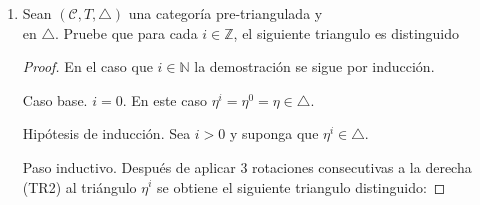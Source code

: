 \documentclass{article}
\begin{document}
\begin{enumerate}[label=\textbf{Ej \arabic*.}]
\begin{proof}
			Como $(\mathscr{C},T,\triangle)$ es categoría triangulada, por el axioma del octaedro existen $g:X'\to Y'$ y $f:Y'\to Z'$ tales que hacen conmutar
			el diagrama (2) y . Así\\
			, 
			y $f^{op},g^{op}$ hacen conmutar el diagrama (1), pues:
			\begin{itemize}
				\item[$\bullet$] $f^{op}i^{op}=(if)^{op}=(vk)^{op}=k^{op}v^{op}$\,.
				\item[$\bullet$] $-i'=f\circ (-k')$ entonces $(-i')^{op}=(f\circ (-k'))^{op}=-(k')^{op}f^{op}$\\ así $i^{op}=k'^{op}f^{op}$.
				\item[$\bullet$] $g^{op}k^{op}=(kg)^{op}=(r)^{op}$.
				\item[$\bullet$] $j^{op}g^{op}=(gj)^{op}=(kT^{-1}(u))^{op}=(T^{-1}(u))^{op}k^{op}=\tilde{T}(u^{op})k^{op}$.
			\end{itemize}
			
		\end{proof}
		\item Sean $(\mathscr{C},T,\triangle)$ una categoría pre-triangulada y  \\en $\triangle$. Pruebe que para cada $i\in \mathbb{Z}$, el siguiente triangulo es distinguido
		
		\begin{center}
		\end{center}
		
		\begin{proof}
			En el caso que $i\in \mathbb{N}$ la demostración se sigue por inducción.
			
			\bigskip
			
			Caso base. $i=0$. En este caso $\eta^{i}=\eta^{0}=\eta \in \triangle$.
			
			Hipótesis de inducción. Sea $i>0$ y suponga que $\eta^{i}\in \triangle$.
			
			Paso inductivo. Después de aplicar 3 rotaciones consecutivas a la derecha (TR2) al tri\'angulo $\eta^{i}$ se obtiene el siguiente triangulo distinguido:
			

\end{proof}
\end{enumerate}
\end{document}
